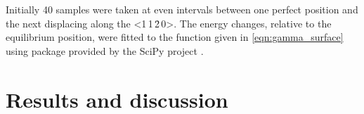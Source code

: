 Initially 40 samples were taken at even intervals between one perfect position and the next displacing along the <1\,1\,\={2}\,0>. The energy changes, relative to the equilibrium position, were fitted to the function given in \ref{eqn:gamma_surface} using  package provided by the SciPy project \cite{SciPy2001}.





\section{Results and discussion}





























